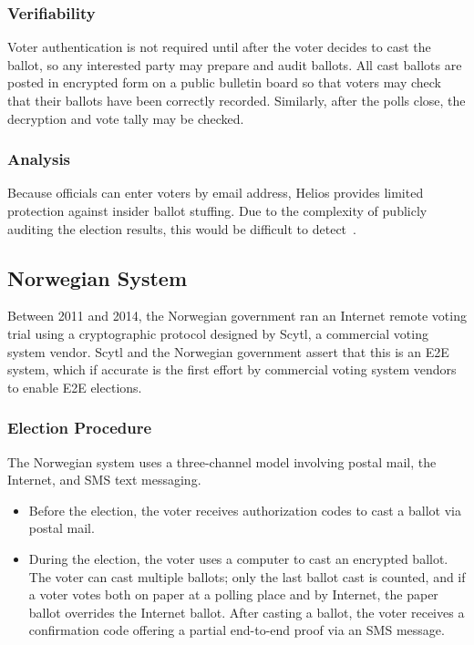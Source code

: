 \subsubsection{Verifiability}

Voter authentication is not required until after the voter decides to
cast the ballot, so any interested party may prepare and audit
ballots. All cast ballots are posted in encrypted form on a public
bulletin board so that voters may check that their ballots have been
correctly recorded. Similarly, after the polls close, the decryption
and vote tally may be checked.

\subsubsection{Analysis}

Because officials can enter voters by email address, Helios provides
limited protection against insider ballot stuffing. Due to the
complexity of publicly auditing the election results, this would be
difficult to detect~\cite{orion2009}.

\subsection{Norwegian System~\cite{gjosteen2012}}

Between 2011 and 2014, the Norwegian government ran an Internet remote
voting trial using a cryptographic protocol designed by Scytl, a
commercial voting system vendor. Scytl and the Norwegian government
assert that this is an E2E system, which if accurate is the first
effort by commercial voting system vendors to enable E2E
elections.

\subsubsection{Election Procedure}

The Norwegian system uses a three-channel model involving postal mail,
the Internet, and SMS text messaging.

\begin{itemize}

\item Before the election, the voter receives authorization codes to
  cast a ballot via postal mail.

\item During the election, the voter uses a computer to cast an
  encrypted ballot. The voter can cast multiple ballots; only the
  last ballot cast is counted, and if a voter votes both on paper at a
  polling place and by Internet, the paper ballot overrides the
  Internet ballot. After casting a ballot, the voter receives a
  confirmation code offering a partial end-to-end proof via an SMS
  message.

\end{itemize}

